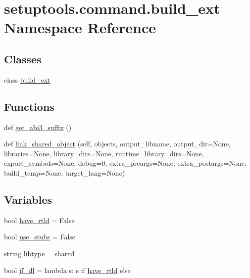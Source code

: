 \hypertarget{namespacesetuptools_1_1command_1_1build__ext}{}\section{setuptools.\+command.\+build\+\_\+ext Namespace Reference}
\label{namespacesetuptools_1_1command_1_1build__ext}
\subsection*{Classes}
\begin{DoxyCompactItemize}
\item 
class \hyperlink{classsetuptools_1_1command_1_1build__ext_1_1build__ext}{build\+\_\+ext}
\end{DoxyCompactItemize}
\subsection*{Functions}
\begin{DoxyCompactItemize}
\item 
def \hyperlink{namespacesetuptools_1_1command_1_1build__ext_ae6906ec7a016e0980a3d09aaacbc0489}{get\+\_\+abi3\+\_\+suffix} ()
\item 
def \hyperlink{namespacesetuptools_1_1command_1_1build__ext_af6495dcefb19a333c4fba87af82b45c6}{link\+\_\+shared\+\_\+object} (self, objects, output\+\_\+libname, output\+\_\+dir=None, libraries=None, library\+\_\+dirs=None, runtime\+\_\+library\+\_\+dirs=None, export\+\_\+symbols=None, debug=0, extra\+\_\+preargs=None, extra\+\_\+postargs=None, build\+\_\+temp=None, target\+\_\+lang=None)
\end{DoxyCompactItemize}
\subsection*{Variables}
\begin{DoxyCompactItemize}
\item 
bool \hyperlink{namespacesetuptools_1_1command_1_1build__ext_a72aec6a687c5be3341dc37d8b017c4c9}{have\+\_\+rtld} = False
\item 
bool \hyperlink{namespacesetuptools_1_1command_1_1build__ext_a2a27c3423f10a8f057c2f558bb7e7dab}{use\+\_\+stubs} = False
\item 
string \hyperlink{namespacesetuptools_1_1command_1_1build__ext_ac22854f97d7214647dc62d6748af00fb}{libtype} = \textquotesingle{}shared\textquotesingle{}
\item 
bool \hyperlink{namespacesetuptools_1_1command_1_1build__ext_a827f3b3ab6de6e389a77d491f0e14dda}{if\+\_\+dl} = lambda s\+: s if \hyperlink{namespacesetuptools_1_1command_1_1build__ext_a72aec6a687c5be3341dc37d8b017c4c9}{have\+\_\+rtld} else \textquotesingle{}\textquotesingle{}
\end{DoxyCompactItemize}


